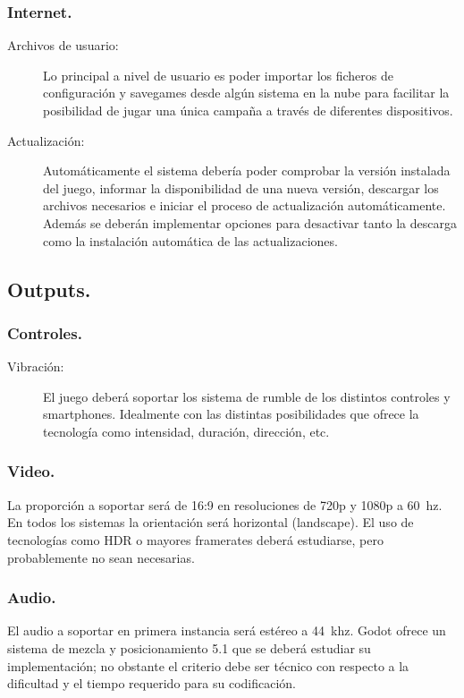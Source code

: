 \subsubsection{Internet.}
\begin{description}
\item[Archivos de usuario:] Lo principal a nivel de usuario es poder importar los ficheros de configuración y savegames desde algún sistema en la nube para facilitar la posibilidad de jugar una única campaña a través de diferentes dispositivos.

\item[Actualización:] Automáticamente el sistema debería poder comprobar la versión instalada del juego, informar la disponibilidad de una nueva versión, descargar los archivos necesarios e iniciar el proceso de actualización automáticamente. Además se deberán implementar opciones para desactivar tanto la descarga como la instalación automática de las actualizaciones.
\end{description}

\subsection{Outputs.}

\subsubsection{Controles.}
\begin{description}
\item[Vibración:] El juego deberá soportar los sistema de rumble de los distintos controles y smartphones. Idealmente con las distintas posibilidades que ofrece la tecnología como intensidad, duración, dirección, etc.
\end{description}

\subsubsection{Video.}
La proporción a soportar será de 16:9 en resoluciones de 720p y 1080p a 60~hz. En todos los sistemas la orientación será horizontal (landscape). El uso de tecnologías como HDR o mayores framerates deberá estudiarse, pero probablemente no sean necesarias.

\subsubsection{Audio.}
El audio a soportar en primera instancia será estéreo a 44~khz. Godot ofrece un sistema de mezcla y posicionamiento 5.1 que se deberá estudiar su implementación; no obstante el criterio debe ser técnico con respecto a la dificultad y el tiempo requerido para su codificación.

